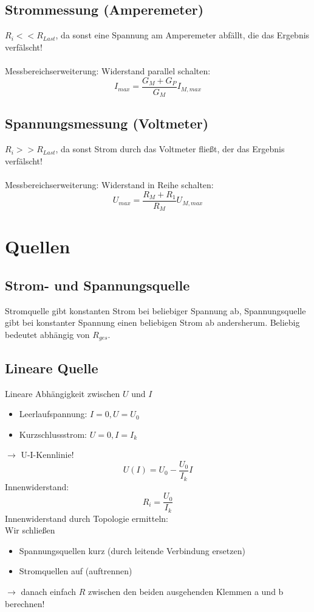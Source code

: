 \documentclass[12pt,a4paper]{article}
\begin{document}
\subsection{Strommessung (Amperemeter)}
$R_i << R_{Last}$, da sonst eine Spannung am Amperemeter abfällt, die das Ergebnis verfälscht!\\
\\
Messbereichserweiterung: Widerstand parallel schalten: \\
\[I_{max} = \frac{G_M+G_P}{G_M}I_{M,max}\]

\subsection{Spannungsmessung (Voltmeter)}
$R_i >> R_{Last}$, da sonst Strom durch das Voltmeter fließt, der das Ergebnis verfälscht!\\
\\
Messbereichserweiterung: Widerstand in Reihe schalten: \\
\[U_{max} = \frac{R_M+R_1}{R_M}U_{M,max}\]

\section{Quellen}
\subsection{Strom- und Spannungsquelle}
Stromquelle gibt konstanten Strom bei beliebiger Spannung ab, Spannungsquelle gibt bei konstanter Spannung einen beliebigen Strom ab andersherum. Beliebig bedeutet abhängig von $R_{ges}$.

\subsection{Lineare Quelle}
Lineare Abhängigkeit zwischen $U$ und $I$
\begin{itemize}
\item Leerlaufspannung: $I = 0, U = U_0$
\item Kurzschlussstrom: $U = 0, I = I_k$
\end{itemize}
$\rightarrow$ U-I-Kennlinie!
\[U(I) = U_0 - \frac{U_0}{I_k}I\]
Innenwiderstand: 
\[R_i = \frac{U_0}{I_k}\]
Innenwiderstand durch Topologie ermitteln:\\
Wir schließen 
\begin{itemize}
\item Spannungsquellen kurz (durch leitende Verbindung ersetzen)
\item Stromquellen auf (auftrennen)
\end{itemize}
$\rightarrow$ danach einfach $R$ zwischen den beiden ausgehenden Klemmen a und b berechnen!
\end{document}
